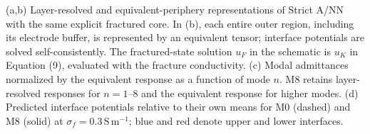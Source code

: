 (a,b) Layer-resolved and equivalent-periphery representations of Strict A/NN with the same explicit fractured core. In (b), each entire outer region, including its electrode buffer, is represented by an equivalent tensor; interface potentials are solved self-consistently. The fractured-state solution $u_F$ in the schematic is $u_K$ in Equation (9), evaluated with the fracture conductivity. (c) Modal admittances normalized by the equivalent response as a function of mode $n$. M8 retains layer-resolved responses for $n=1$--$8$ and the equivalent response for higher modes. (d) Predicted interface potentials relative to their own means for M0 (dashed) and M8 (solid) at $\sigma_f=0.3\,\mathrm{S\,m^{-1}}$; blue and red denote upper and lower interfaces.
